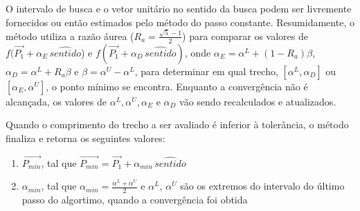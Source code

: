 \documentclass[10pt, a4paper]{article}
\begin{document}
O intervalo de busca e o vetor unitário no sentido da busca podem ser livremente fornecidos ou então estimados
pelo método do passo constante. Resumidamente, o método utiliza a razão áurea ($R_a = \frac{\sqrt{5} - 1}{2}$) para comparar os 
valores de $f(\overrightarrow{P_1} + \alpha_{E}\,\hat{sentido}$) e $f(\overrightarrow{P_1} + \alpha_{D}\,\hat{sentido})$,
onde $\alpha_{E} = \alpha^L + (1 - R_a )\beta$, $\alpha_{D} = \alpha^L + R_a\beta$ e $\beta = \alpha^U - \alpha^L$, 
para determinar em qual trecho, $[\alpha^L, \alpha_{D}]$ ou $[\alpha_{E}, \alpha^U]$, o ponto mínimo se encontra. Enquanto a
convergência não é alcançada, os valores de $\alpha^L, \alpha^U, \alpha_E$ e $\alpha_D$ vão sendo recalculados e atualizados.

Quando o comprimento do trecho a ser avaliado é inferior à tolerância, o método finaliza e retorna os seguintes valores:

\begin{enumerate}
  \item $\overrightarrow{P_{min}}$, tal que $\overrightarrow{P_{min}} = \overrightarrow{P_1} + \alpha_{min}\,\hat{sentido}$
  \item $\alpha_{min}$, tal que $\alpha_{min} = \frac{\alpha^L + \alpha^U}{2}$ e $\alpha^L$, $\alpha^U$ são os extremos do
  intervalo do último passo do algortimo, quando a convergência foi obtida
\end{enumerate} 
\end{document}
